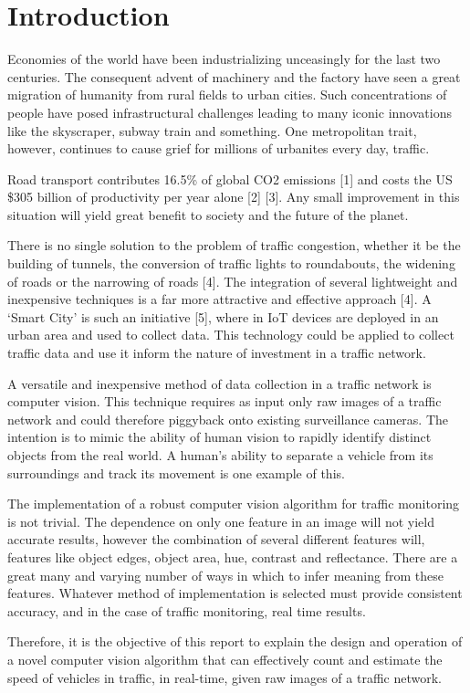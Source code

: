 \chapter{Introduction}
\parskip 0.2in
Economies of the world have been industrializing unceasingly for the last two centuries. The consequent advent of machinery and the factory have seen a great migration of humanity from rural fields to urban cities. Such concentrations of people have posed infrastructural challenges leading to many iconic innovations like the skyscraper, subway train and something. One metropolitan trait, however, continues to cause grief for millions of urbanites every day, traffic.  

Road transport contributes 16.5\% of global CO2 emissions [1] and costs the US \$305 billion of productivity per year alone [2] [3]. Any small improvement in this situation will yield great benefit to society and the future of the planet.  

There is no single solution to the problem of traffic congestion, whether it be the building of tunnels, the conversion of traffic lights to roundabouts, the widening of roads or the narrowing of roads [4]. The integration of several lightweight and inexpensive techniques is a far more attractive and effective approach [4]. A ‘Smart City’ is such an initiative [5], where in IoT devices are deployed in an urban area and used to collect data. This technology could be applied to collect traffic data and use it inform the nature of investment in a traffic network. 

A versatile and inexpensive method of data collection in a traffic network is computer vision. This technique requires as input only raw images of a traffic network and could therefore piggyback onto existing surveillance cameras. The intention is to mimic the ability of human vision to rapidly identify distinct objects from the real world. A human’s ability to separate a vehicle from its surroundings and track its movement is one example of this.  

The implementation of a robust computer vision algorithm for traffic monitoring is not trivial. The dependence on only one feature in an image will not yield accurate results, however the combination of several different features will, features like object edges, object area, hue, contrast and reflectance. There are a great many and varying number of ways in which to infer meaning from these features. Whatever method of implementation is selected must provide consistent accuracy, and in the case of traffic monitoring, real time results.  

Therefore, it is the objective of this report to explain the design and operation of a novel computer vision algorithm that can effectively count and estimate the speed of vehicles in traffic, in real-time, given raw images of a traffic network. 



